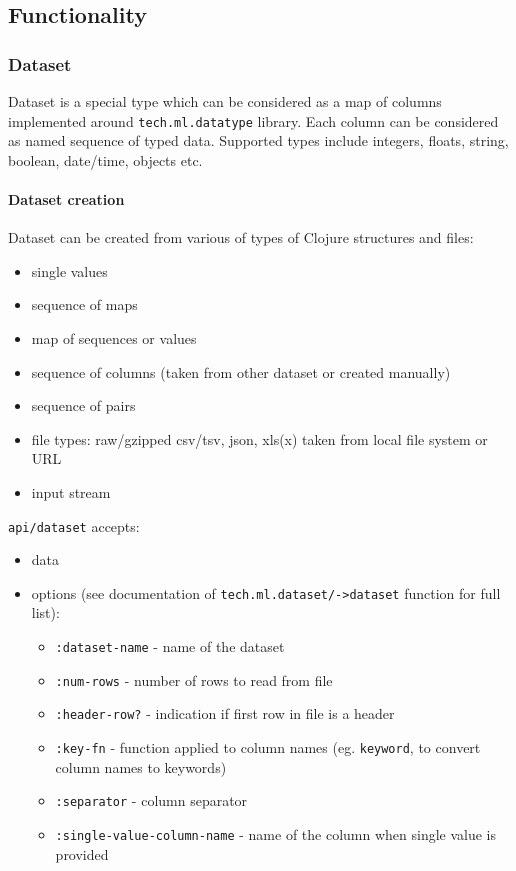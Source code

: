 \documentclass[]{article}
\providecommand{\tightlist}{%
  \setlength{\itemsep}{0pt}\setlength{\parskip}{0pt}}
\let\oldparagraph\paragraph
\renewcommand{\paragraph}[1]{\oldparagraph{#1}\mbox{}}
\begin{document}
\hypertarget{functionality}{%
\subsection{Functionality}\label{functionality}}

\hypertarget{dataset}{%
\subsubsection{Dataset}\label{dataset}}

Dataset is a special type which can be considered as a map of columns
implemented around \texttt{tech.ml.datatype} library. Each column can be
considered as named sequence of typed data. Supported types include
integers, floats, string, boolean, date/time, objects etc.

\hypertarget{dataset-creation}{%
\paragraph{Dataset creation}\label{dataset-creation}}

Dataset can be created from various of types of Clojure structures and
files:

\begin{itemize}
\tightlist
\item
  single values
\item
  sequence of maps
\item
  map of sequences or values
\item
  sequence of columns (taken from other dataset or created manually)
\item
  sequence of pairs
\item
  file types: raw/gzipped csv/tsv, json, xls(x) taken from local file
  system or URL
\item
  input stream
\end{itemize}

\texttt{api/dataset} accepts:

\begin{itemize}
\tightlist
\item
  data
\item
  options (see documentation of
  \texttt{tech.ml.dataset/-\textgreater{}dataset} function for full
  list):

  \begin{itemize}
  \tightlist
  \item
    \texttt{:dataset-name} - name of the dataset
  \item
    \texttt{:num-rows} - number of rows to read from file
  \item
    \texttt{:header-row?} - indication if first row in file is a header
  \item
    \texttt{:key-fn} - function applied to column names (eg.
    \texttt{keyword}, to convert column names to keywords)
  \item
    \texttt{:separator} - column separator
  \item
    \texttt{:single-value-column-name} - name of the column when single
    value is provided
  \end{itemize}
\end{itemize}
\end{document}
